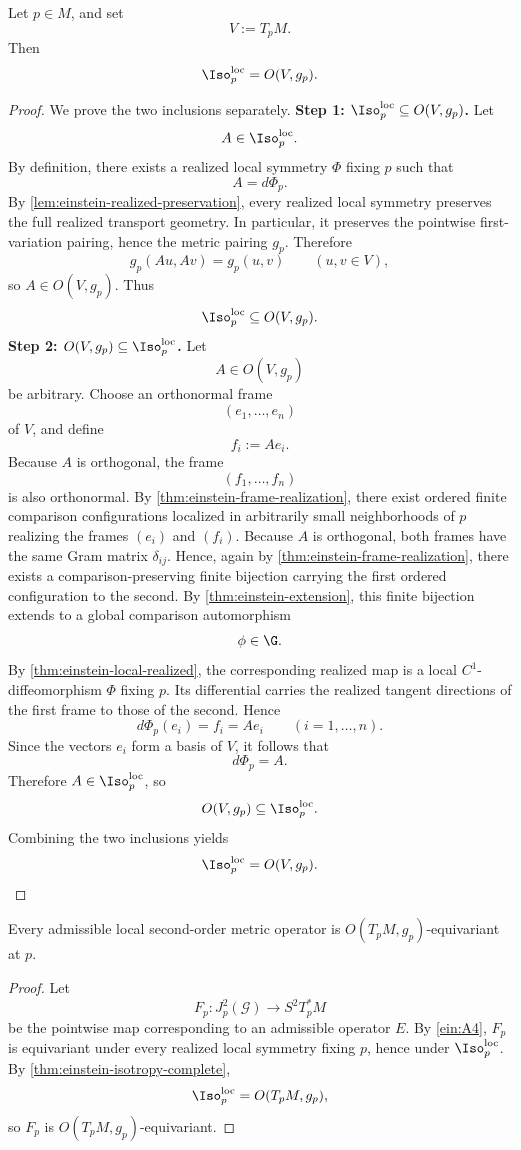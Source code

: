 \begin{theorem}
	\label{thm:einstein-isotropy-complete}
	Let \(p\in M\), and set
	\[
		V:=T_pM.
	\]
	Then
	\[
		\Iso^{\mathrm{loc}}_p = O(V,g_p).
	\]
\end{theorem}
\begin{proof}
	We prove the two inclusions separately.
	\medskip
	\noindent
	\textbf{Step 1: \(\Iso^{\mathrm{loc}}_p\subseteq O(V,g_p)\).}
	Let
	\[
		A\in \Iso^{\mathrm{loc}}_p.
	\]
	By definition, there exists a realized local symmetry \(\Phi\) fixing
	\(p\) such that
	\[
		A=d\Phi_p.
	\]
	By \cref{lem:einstein-realized-preservation}, every realized local
	symmetry preserves the full realized transport geometry.
	In particular, it preserves the pointwise first-variation pairing, hence
	the metric pairing \(g_p\).
	Therefore
	\[
		g_p(Au,Av)=g_p(u,v)
		\qquad
		(u,v\in V),
	\]
	so \(A\in O(V,g_p)\).
	Thus
	\[
		\Iso^{\mathrm{loc}}_p\subseteq O(V,g_p).
	\]
	\medskip
	\noindent
	\textbf{Step 2: \(O(V,g_p)\subseteq \Iso^{\mathrm{loc}}_p\).}
	Let
	\[
		A\in O(V,g_p)
	\]
	be arbitrary.
	Choose an orthonormal frame
	\[
		(e_1,\dots,e_n)
	\]
	of \(V\), and define
	\[
		f_i:=Ae_i.
	\]
	Because \(A\) is orthogonal, the frame
	\[
		(f_1,\dots,f_n)
	\]
	is also orthonormal.
	By \cref{thm:einstein-frame-realization}, there exist ordered finite
	comparison configurations localized in arbitrarily small neighborhoods
	of \(p\) realizing the frames \((e_i)\) and \((f_i)\).
	Because \(A\) is orthogonal, both frames have the same Gram matrix
	\(\delta_{ij}\).
	Hence, again by \cref{thm:einstein-frame-realization}, there exists a
	comparison-preserving finite bijection carrying the first ordered
	configuration to the second.
	By \cref{thm:einstein-extension}, this finite bijection extends to a
	global comparison automorphism
	\[
		\phi\in\G.
	\]
	By \cref{thm:einstein-local-realized}, the corresponding realized map is
	a local \(C^1\)-diffeomorphism \(\Phi\) fixing \(p\).
	Its differential carries the realized tangent directions of the first
	frame to those of the second.
	Hence
	\[
		d\Phi_p(e_i)=f_i=Ae_i
		\qquad
		(i=1,\dots,n).
	\]
	Since the vectors \(e_i\) form a basis of \(V\), it follows that
	\[
		d\Phi_p=A.
	\]
	Therefore \(A\in\Iso^{\mathrm{loc}}_p\), so
	\[
		O(V,g_p)\subseteq \Iso^{\mathrm{loc}}_p.
	\]
	Combining the two inclusions yields
	\[
		\Iso^{\mathrm{loc}}_p = O(V,g_p).
	\]
\end{proof}
\begin{corollary}
	\label{cor:einstein-full-equivariance}
	Every admissible local second-order metric operator is
	\(O(T_pM,g_p)\)-equivariant at \(p\).
\end{corollary}
\begin{proof}
	Let
	\[
		F_p:J_p^2(\mathcal G)\to S^2T_p^*M
	\]
	be the pointwise map corresponding to an admissible operator \(E\).
	By \textup{\ref{ein:A4}}, \(F_p\) is equivariant under every realized
	local symmetry fixing \(p\), hence under \(\Iso^{\mathrm{loc}}_p\).
	By \cref{thm:einstein-isotropy-complete},
	\[
		\Iso^{\mathrm{loc}}_p = O(T_pM,g_p),
	\]
	so \(F_p\) is \(O(T_pM,g_p)\)-equivariant.
\end{proof}
